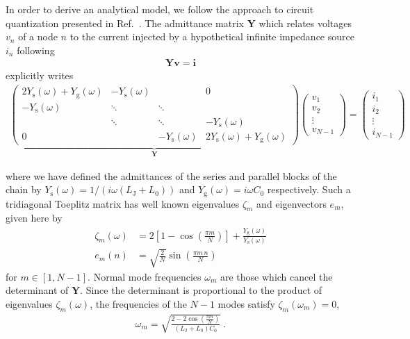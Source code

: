In order to derive an analytical model, we follow the approach to circuit quantization presented in Ref.~\cite{gelyQuCATQuantumCircuit2019}.
%
The admittance matrix $\mathbf{Y}$ which relates voltages $v_n$ of a node $n$ to the current injected by a hypothetical infinite impedance source $i_n$ following 
\begin{align}
\mathbf{Y}\mathbf{v} = \mathbf{i}
\label{eq:v_to_i_relation}
\end{align}
explicitly writes
\begin{align}
\underbrace{\begin{pmatrix} 
	2Y_\text{s}(\omega)+Y_\text{g} (\omega) & - Y_\text{s}(\omega) &  & 0 \\
	- Y_\text{s}(\omega) & \ddots & \ddots &  \\
	& \ddots & \ddots & -Y_\text{s}(\omega)  \\
	0 &  & -Y_\text{s}(\omega) & 2Y_\text{s}(\omega)+Y_\text{g} (\omega)
	\end{pmatrix}}_{\mathbf{Y}}
\begin{pmatrix}
v_{1} \\
v_{2} \\
\vdots \\
v_{N-1}
\end{pmatrix}
=
\begin{pmatrix}
i_{1} \\
i_{2} \\
\vdots \\
i_{N-1}
\end{pmatrix}
\label{eq:admittance_matrix}
\end{align}

where we have defined the admittances of the series and parallel blocks of the chain by $Y_\text{s}(\omega)  = 1/(i \omega (L_\text{J}+L_0))$ and $Y_\text{g}(\omega)  = i \omega C_0$ respectively.
%
Such a tridiagonal Toeplitz matrix \cite{noscheseTridiagonalToeplitzMatrices2013} has well known eigenvalues $\zeta_m$ and eigenvectors $e_m$, given here by
\begin{align}
\zeta_m(\omega) &=  2 \left[ 1 - \cos \left(\frac{\pi m}{N}\right) \right] + \frac{Y_\text{g}(\omega)}{Y_\text{s} (\omega)} \\
e_{m}(n) &= \sqrt{\frac{2}{N}} \sin\left(\frac{\pi m \, n}{N}\right)
\end{align}
for $m\in[1,N-1]$.
%
Normal mode frequencies $\omega_m$ are those which cancel the determinant of $\textbf{Y}$.
%
Since the determinant is proportional to the product of eigenvalues $\zeta_m(\omega)$, the frequencies of the $N-1$ modes satisfy $\zeta_m(\omega_m) = 0$,
\begin{align}
\omega_m = \sqrt{\frac{2-2\cos\left(\frac{\pi m}{N}\right)}{(L_\text{J}+L_0)C_0}}\ .
\label{eq:anh-wm}
\end{align}


